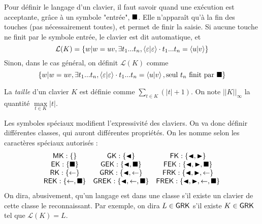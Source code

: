 \documentclass[12pt, a4paper]{article}
\renewcommand{\L}{\mathcal{L}}
\newcommand{\Kinf}{||K||_{\infty}}
\begin{document}
    Pour définir le langage d'un clavier, il faut savoir quand une exécution est acceptante, grâce à un symbole "entrée", $\mathord{\blacksquare}$. Elle n'apparaît qu'à la fin des touches (pas nécessairement toutes), et permet de finir la saisie.
    Si aucune touche ne finit par le symbole entrée, le clavier est dit automatique, et \[\L(K) = \{w | w =uv, \exists t_1...t_n, \conf{\varepsilon}{\varepsilon}\cdot t_1...t_n = \conf{u}{v}\}\]
    Sinon, dans le cas général, on définit $\L(K)$ comme \[\{w | w =uv, \exists t_1...t_n, \left\langle \varepsilon \middle| \varepsilon \right\rangle\cdot t_1...t_n = \left\langle u \middle| v \right\rangle, \mathrm{seul~} t_n \mathrm{~finit~par~\mathord{\blacksquare}}\}\]
    
    La \emph{taille} d'un clavier $K$ est définie comme $\sum_{t \in K} (|t| + 1)$.
    On note $\Kinf$ la quantité $\max\limits_{t \in K} |t|$.
    
    Les symboles spéciaux modifient l'expressivité des claviers. On va donc définir différentes classes, qui auront différentes propriétés. On les nomme selon les caractères spéciaux autorisés :
    \[
    \begin{array}{ccc}
        \mathsf{MK} : \{\} & \mathsf{GK} : \{\mathord{\blacktriangleleft}\} & \mathsf{FK} :\{\mathord{\blacktriangleleft},\mathord{\blacktriangleright}\} \\
        \mathsf{EK} : \{\mathord{\blacksquare}\} & \mathsf{GEK} : \{\mathord{\blacktriangleleft},\mathord{\blacksquare}\} & \mathsf{FEK} :\{\mathord{\blacktriangleleft},\mathord{\blacktriangleright},\mathord{\blacksquare}\} \\
        \mathsf{RK} : \{\mathord{\leftarrow}\} & \mathsf{GRK} : \{\mathord{\blacktriangleleft},\mathord{\leftarrow}\} & \mathsf{FRK} :\{\mathord{\blacktriangleleft},\mathord{\blacktriangleright},\mathord{\leftarrow}\} \\
        \mathsf{REK} : \{\mathord{\leftarrow}, \mathord{\blacksquare}\} & \mathsf{GREK} : \{\mathord{\blacktriangleleft},\mathord{\leftarrow},\mathord{\blacksquare}\} & \mathsf{FREK} :\{\mathord{\blacktriangleleft},\mathord{\blacktriangleright},\mathord{\leftarrow},\mathord{\blacksquare}\} \\
    \end{array}
    \]
    On dira, abusivement, qu'un langage est dans une classe s'il existe un clavier de cette classe le reconnaissant. Par exemple, on dira $L \in \mathsf{GRK}$ s'il existe $K \in \mathsf{GRK}$ tel que $\L(K) = L$.
    \clearpage
\end{document}

